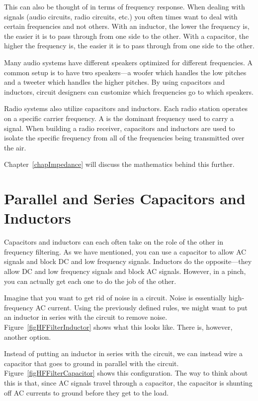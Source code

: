 This can also be thought of in terms of frequency response.
When dealing with signals (audio circuits, radio circuits, etc.) you often times want to deal with certain frequencies and not others.
With an inductor, the lower the frequency is, the easier it is to pass through from one side to the other.
With a capacitor, the higher the frequency is, the easier it is to pass through from one side to the other.

Many audio systems have different speakers optimized for different frequencies.
A common setup is to have two speakers---a woofer which handles the low pitches and a tweeter which handles the higher pitches.
By using capacitors and inductors, circuit designers can customize which frequencies go to which speakers.

Radio systems also utilize capacitors and inductors.
Each radio station operates on a specific carrier frequency.
A  is the dominant frequency used to carry a signal.
When building a radio receiver, capacitors and inductors are used to isolate the specific frequency from all of the frequencies being transmitted over the air.

Chapter~\ref{chapImpedance} will discuss the mathematics behind this further.

\section{Parallel and Series Capacitors and Inductors}

Capacitors and inductors can each often take on the role of the other in frequency filtering.
As we have mentioned, you can use a capacitor to allow AC signals and block DC and low frequency signals.
Inductors do the opposite---they allow DC and low frequency signals and block AC signals.
However, in a pinch, you can actually get each one to do the job of the other.


Imagine that you want to get rid of noise in a circuit.
Noise is essentially high-frequency AC current.
Using the previously defined rules, we might want to put an inductor in series with the circuit to remove noise.
Figure~\ref{figHFFilterInductor} shows what this looks like.
There is, however, another option.

Instead of putting an inductor in series with the circuit, we can instead wire a capacitor that goes to ground in parallel with the circuit.
Figure~\ref{figHFFilterCapacitor} shows this configuration.
The way to think about this is that, since AC signals travel through a capacitor, the capacitor is shunting off AC currents to ground before they get to the load.

